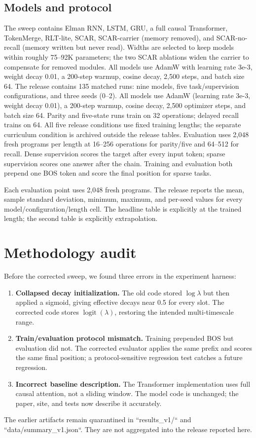 \documentclass{article}
\begin{document}
\subsection{Models and protocol}
The sweep contains Elman RNN, LSTM, GRU, a full causal Transformer, TokenMerge,
RLT-lite, SCAR, SCAR-carrier (memory removed), and SCAR-no-recall (memory
written but never read). Widths are selected to keep models within roughly
75--92K parameters; the two SCAR ablations widen the carrier to compensate for
removed modules. All models use AdamW with learning rate 3e-3, weight decay
0.01, a 200-step warmup, cosine decay, 2,500 steps, and batch size 64.
The release contains 135 matched runs: nine models, five task/supervision configurations, and three seeds (0--2). All models use AdamW (learning rate 3e-3, weight decay 0.01), a 200-step warmup, cosine decay, 2,500 optimizer steps, and batch size 64. Parity and five-state runs train on 32 operations; delayed recall trains on 64. All five release conditions use fixed training lengths; the separate curriculum condition is archived outside the release tables. Evaluation uses 2,048 fresh programs per length at 16--256 operations for parity/five and 64--512 for recall. Dense supervision scores the target after every input token; sparse supervision scores one answer after the chain. Training and evaluation both prepend one BOS token and score the final position for sparse tasks.

Each evaluation point uses 2,048 fresh programs. The release reports the mean,
sample standard deviation, minimum, maximum, and per-seed values for every
model/configuration/length cell. The headline table is explicitly at the
trained length; the second table is explicitly extrapolation.

\section{Methodology audit}
Before the corrected sweep, we found three errors in the experiment harness:
\begin{enumerate}
\item \textbf{Collapsed decay initialization.} The old code stored
$\log\lambda$ but then applied a sigmoid, giving effective decays near
0.5 for every slot. The corrected code stores $\operatorname{logit}(\lambda)$,
restoring the intended multi-timescale range.
\item \textbf{Train/evaluation protocol mismatch.} Training prepended BOS but
evaluation did not. The corrected evaluator applies the same prefix and scores
the same final position; a protocol-sensitive regression test catches a future
regression.
\item \textbf{Incorrect baseline description.} The Transformer implementation
uses full causal attention, not a sliding window. The model code is unchanged;
the paper, site, and tests now describe it accurately.
\end{enumerate}
The earlier artifacts remain quarantined in ``results\_v1/`` and
``data/summary\_v1.json``. They are not aggregated into the release reported
here.
\end{document}
